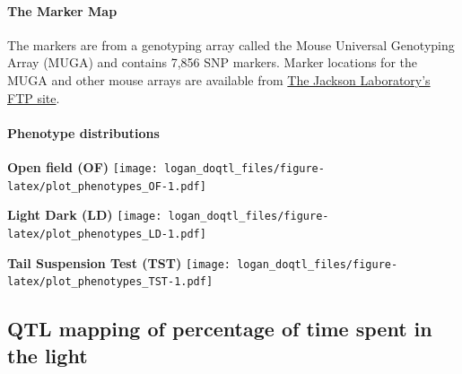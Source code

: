\documentclass[]{article}
\let\oldparagraph\paragraph
\renewcommand{\paragraph}[1]{\oldparagraph{#1}\mbox{}}
\begin{document}
\paragraph{The Marker Map}\label{the-marker-map}

The markers are from a genotyping array called the Mouse Universal
Genotyping Array (MUGA) and contains 7,856 SNP markers. Marker locations
for the MUGA and other mouse arrays are available from
\href{ftp://ftp.jax.org/MUGA}{The Jackson Laboratory's FTP site}.

\paragraph{Phenotype distributions}\label{phenotype-distributions}

\textbf{Open field (OF)}
\texttt{[image: logan\_doqtl\_files/figure-latex/plot\_phenotypes\_OF-1.pdf]}

\textbf{Light Dark (LD)}
\texttt{[image: logan\_doqtl\_files/figure-latex/plot\_phenotypes\_LD-1.pdf]}

\textbf{Tail Suspension Test (TST)}
\texttt{[image: logan\_doqtl\_files/figure-latex/plot\_phenotypes\_TST-1.pdf]}

\subsection{QTL mapping of percentage of time spent in the
light}\label{qtl-mapping-of-percentage-of-time-spent-in-the-light}
\end{document}
